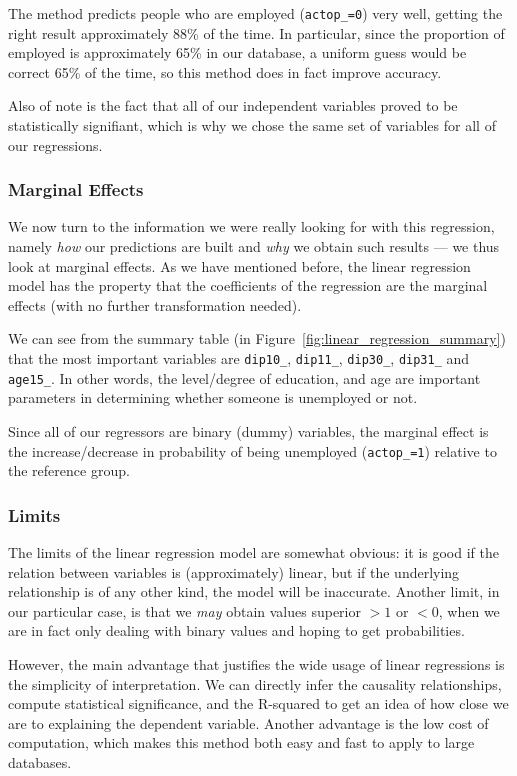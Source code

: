 The method predicts people who are employed (\texttt{actop\_=0}) very well, getting the right result approximately 88\% of the time. In particular, since the proportion of employed is approximately 65\% in our database, a uniform guess would be correct 65\% of the time, so this method does in fact improve accuracy.

Also of note is the fact that all of our independent variables proved to be statistically signifiant, which is why we chose the same set of variables for all of our regressions.

\subsubsection{Marginal Effects}
We now turn to the information we were really looking for with this regression, namely \textit{how} our predictions are built and \textit{why} we obtain such results --- we thus look at marginal effects. As we have mentioned before, the linear regression model has the property that the coefficients of the regression are the marginal effects (with no further transformation needed).

We can see from the summary table (in Figure~\ref{fig:linear_regression_summary}) that the most important variables are \texttt{dip10\_}, \texttt{dip11\_}, \texttt{dip30\_}, \texttt{dip31\_} and \texttt{age15\_}. In other words, the level/degree of education, and age are important parameters in determining whether someone is unemployed or not.

Since all of our regressors are binary (dummy) variables, the marginal effect is the increase/decrease in probability of being unemployed (\texttt{actop\_=1}) relative to the reference group.

\subsubsection{Limits}
The limits of the linear regression model are somewhat obvious: it is good if the relation between variables is (approximately) linear, but if the underlying relationship is of any other kind, the model will be inaccurate. Another limit, in our particular case, is that we \textit{may} obtain values superior $>1$ or $<0$, when we are in fact only dealing with binary values and hoping to get probabilities.

However, the main advantage that justifies the wide usage of linear regressions is the simplicity of interpretation. We can directly infer the causality relationships, compute statistical significance, and the R-squared to get an idea of how close we are to explaining the dependent variable. Another advantage is the low cost of computation, which makes this method both easy and fast to apply to large databases.


